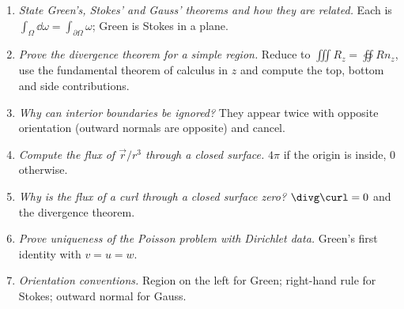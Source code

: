 \begin{interview}
\begin{enumerate}
  \item \emph{State Green's, Stokes' and Gauss' theorems and how they are related.} Each is $\int_\Omega\dd\omega=\int_{\partial\Omega}\omega$; Green is Stokes in a plane.
  \item \emph{Prove the divergence theorem for a simple region.} Reduce to $\iiint R_z=\oiint Rn_z$, use the fundamental theorem of calculus in $z$ and compute the top, bottom and side contributions.
  \item \emph{Why can interior boundaries be ignored?} They appear twice with opposite orientation (outward normals are opposite) and cancel.
  \item \emph{Compute the flux of $\vec r/r^3$ through a closed surface.} $4\pi$ if the origin is inside, $0$ otherwise.
  \item \emph{Why is the flux of a curl through a closed surface zero?} $\divg\curl=0$ and the divergence theorem.
  \item \emph{Prove uniqueness of the Poisson problem with Dirichlet data.} Green's first identity with $v=u=w$.
  \item \emph{Orientation conventions.} Region on the left for Green; right-hand rule for Stokes; outward normal for Gauss.
\end{enumerate}
\end{interview}

